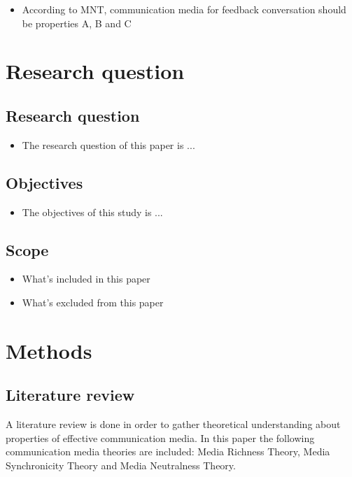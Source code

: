 \documentclass[english,12pt,a4paper,pdftex]{article}
\begin{document}
\begin{itemize}
\item According to MNT, communication media for feedback conversation should be properties A, B and C
\end{itemize}


\section{Research question}

\subsection{Research question}

\begin{itemize}
\item The research question of this paper is ...
\end{itemize}

\subsection{Objectives}

\begin{itemize}
\item The objectives of this study is ...
\end{itemize}

\subsection{Scope}

\begin{itemize}
\item What's included in this paper
\item What's excluded from this paper
\end{itemize}


\section{Methods}

\subsection{Literature review}

A literature review is done in order to gather theoretical understanding about properties of effective communication media. In this paper the following communication media theories are included: Media Richness Theory, Media Synchronicity Theory and Media Neutralness Theory. 
\end{document}
